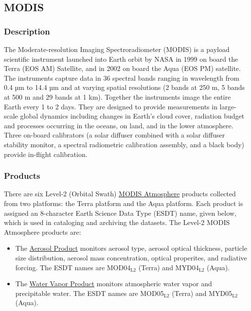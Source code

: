 \documentclass[11pt]{article}
\begin{document}
\subsection{MODIS}
\label{sec-1-9}

\subsubsection{Description}
\label{sec-1-9-1}
The Moderate-resolution Imaging Spectroradiometer (MODIS) is a
payload scientific instrument launched into Earth orbit by NASA in
1999 on board the Terra (EOS AM) Satellite, and in 2002 on board
the Aqua (EOS PM) satellite. The instruments capture data in 36
spectral bands ranging in wavelength from 0.4 µm to 14.4 µm and at
varying spatial resolutions (2 bands at 250 m, 5 bands at 500 m
and 29 bands at 1 km). Together the instruments image the entire
Earth every 1 to 2 days. They are designed to provide measurements
in large-scale global dynamics including changes in Earth's cloud
cover, radiation budget and processes occurring in the oceans, on
land, and in the lower atmosphere. Three on-board calibrators (a
solar diffuser combined with a solar diffuser stability monitor, a
spectral radiometric calibration assembly, and a black body)
provide in-flight calibration. 
\subsubsection{Products}
\label{sec-1-9-2}
There are six Level-2 (Orbital Swath) \href{http://modis-atmos.gsfc.nasa.gov/MOD06_L2/index.html}{MODIS Atmosphere} products
collected from two platforms: the Terra platform and the Aqua
platform. Each product is assigned an 8-character Earth Science Data
Type (ESDT) name, given below, which is used in cataloging and
archiving the datasets. The Level-2 MODIS Atmosphere products are:

\begin{itemize}
\item The \href{http://modis-atmos.gsfc.nasa.gov/MOD04_L2/index.html}{Aerosol Product} monitors aerosol type, aerosol optical
thickness, particle size distribution, aerosol mass
concentration, optical properites, and radiative forcing. The
ESDT names are MOD04$_{\text{L2}}$ (Terra) and MYD04$_{\text{L2}}$ (Aqua).
\end{itemize}


\begin{itemize}
\item The \href{http://modis-atmos.gsfc.nasa.gov/MOD05_L2/index.html}{Water Vapor Product} monitors atmospheric water vapor and
precipitable water. The ESDT names are MOD05$_{\text{L2}}$ (Terra) and MYD05$_{\text{L2}}$ (Aqua).
\end{itemize}
\end{document}
